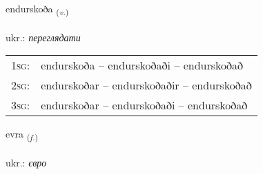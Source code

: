 \documentclass[frontgrid, backgrid]{flacards}\usepackage[]{graphicx}\usepackage[]{xcolor}
\begin{document}
\renewcommand{\blhead}{\vskip5pt {\small\bfseries\footnotesize Sagnorð | дієслово }}
\renewcommand{\bcfoot}{\vskip5pt \hspace{2pt}{\small\bfseries\footnotesize 2K}}


{endurskoða \small{\textsubscript{(\textit{v.})}} \\[1ex] %
 \\
ukr.: \emph{переглядати} \\  [2ex]
\renewcommand*{\arraystretch}{0.8}
\begin{tabular}{p{1cm}l}
\textsc{1sg}: & endurskoða -- endurskoðaði -- endurskoðað \\ 
\textsc{2sg}: & endurskoðar -- endurskoðaðir -- endurskoðað \\ 
\textsc{3sg}: & endurskoðar -- endurskoðaði -- endurskoðað \\ 
\end{tabular}
}

\renewcommand{\flhead}{\vskip5pt \fboxsep=0pt {\small\bfseries\footnotesize Nafnorð | іменник}}
\renewcommand{\fcfoot}{\vskip5pt \fboxsep=0pt \hspace{2pt}{\small\bfseries\footnotesize 2K}}

\renewcommand{\blhead}{\vskip5pt {\small\bfseries\footnotesize Nafnorð | іменник }}
\renewcommand{\bcfoot}{\vskip5pt \hspace{2pt}{\small\bfseries\footnotesize 2K}}


{evra \small{\textsubscript{(\textit{f.})}} \\[1ex] %
\textphonetic{[ɛvra]} \\
ukr.: \emph{євро} \\  [2ex]
\renewcommand*{\arraystretch}{0.8}
}
\end{document}
